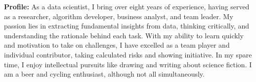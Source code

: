 
\vspace*{-3mm}
\begin{tcolorbox}[
        width=\textwidth,
        colback={gray!30},
        colframe=white,
        sharp corners,
        boxrule=0mm,
        arc=1mm,
    ]
    \begin{spacing}{1.2}
        \begin{multicols}{2}
            {\bf\large Profile:}
            As a data scientist, I bring over eight years of experience, having served as a researcher, algorithm developer, business analyst, and team leader. My passion lies in extracting fundamental insights from data, thinking critically, and understanding the rationale behind each task. With my ability to learn quickly and motivation to take on challenges, I have excelled as a team player and individual contributor, taking calculated risks and showing initiative. In my spare time, I enjoy intellectual pursuits like drawing and writing about science fiction.
            I am a beer and cycling enthusiast, although not all simultaneously.

        \end{multicols}
    \end{spacing}
    \vspace*{-4mm}

\end{tcolorbox}

\vspace*{-6mm}